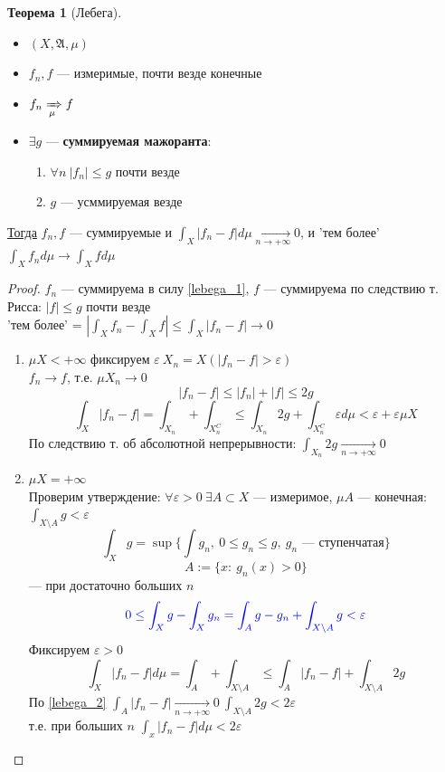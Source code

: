 \documentclass[oneside]{book}
\newcommand{\A}{\mathfrak{A}}
\theoremstyle{plain}
\theoremstyle{remark}
\theoremstyle{definition}
\newtheorem{theorem}{Теорема}[section]
\begin{document}
\begin{theorem}[Лебега]
\-
\begin{itemize}
\item \((X, \A, \mu)\)
\item \(f_n, f\) --- измеримые, почти везде конечные
\item \(f_n \xRightarrow[\mu]{} f\)
\item \(\exists g\) --- \textbf{суммируемая мажоранта}:
\begin{enumerate}
\item \label{lebega_1} \(\forall n\ |f_n| \le g\) почти везде
\item \(g\) --- усммируемая везде
\end{enumerate}
\end{itemize}
\uline{Тогда} \(f_n, f\) --- суммируемые и \(\int_X |f_n - f|d\mu\xrightarrow[n \to + \infty]{}0\), и 'тем более' \(\int_X f_n d\mu \to \int_X f d\mu\)
\end{theorem}
\begin{proof}
\(f_n\) --- суммируема в силу \ref{lebega_1}, \(f\) --- суммируема по следствию т. Рисса: \(|f| \le g\) почти везде \\
'тем более' = \(\left|\int_X f_n - \int_X f \right| \le \int_X |f_n - f| \to 0\)
\begin{enumerate}
\item \label{lebega_2} \(\mu X < + \infty\) фиксируем \(\varepsilon\ X_n = X(|f_n - f| > \varepsilon)\) \\
\(f_n \to f\), т.е. \(\mu X_n \to 0\)
\[ |f_n - f| \le |f_n| + |f| \le 2g \]
\[ \int_X|f_n - f| = \int_{X_n}+\int_{X_n^C} \le \int_{X_n} 2g + \int_{X_n^C} \varepsilon d\mu < \varepsilon + \varepsilon \mu X\]
По следствию т. об абсолютной непрерывности: \(\int_{X_n} 2g \xrightarrow[n \to + \infty]{} 0\)
\item \(\mu X = + \infty\) \\
Проверим утверждение: \(\forall \varepsilon > 0\ \exists A \subset X\) --- измеримое, \(\mu A\) --- конечная: \(\int_{X\setminus A} g < \varepsilon\)
\[ \int_X g = \sup \{\int g_n,\ 0\le g_n\le g,\ g_n\text{ --- ступенчатая}\} \]
\[ A := \{x:\ g_n(x) > 0\} \]
--- при достаточно больших \(n\)
\[\color{blue} 0 \le \int_X g - \int_X g_n = \int_A g- g_n + \int_{X\setminus A}g < \varepsilon \]
Фиксируем \(\varepsilon > 0\)
\[ \int_X |f_n - f| d\mu = \int_A + \int_{X\setminus A} \le \int_A |f_n -f| + \int_{X\setminus A}2g \]
По \ref{lebega_2} \(\int_A|f_n - f| \xrightarrow[n \to + \infty]{} 0\ \int_{X\setminus A}2g < 2\varepsilon\) \\
т.е. при больших \(n\) \(\int_x |f_n -f|d\mu < 2\varepsilon\)
\end{enumerate}
\end{proof}
\end{document}
